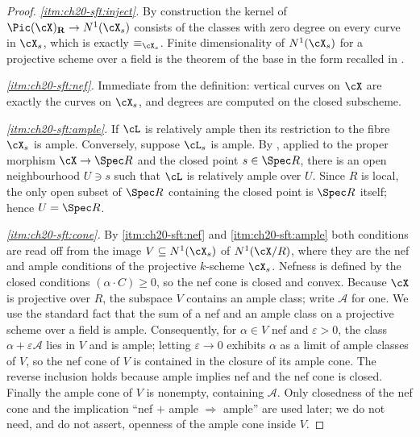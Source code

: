 \begin{proof}
\emph{\cref{itm:ch20-sft:inject}.}  By construction the kernel of
\(\Pic(\cX)_{\mathbf R}\to N^1(\cX_s)\) consists of the classes with zero
degree on every curve in \(\cX_s\), which is exactly \(\equiv_{\cX_s}\).
Finite dimensionality of \(N^1(\cX_s)\) for a projective scheme over a field
is the theorem of the base in the form recalled in
.

\emph{\cref{itm:ch20-sft:nef}.}  Immediate from the definition: vertical
curves on \(\cX\) are exactly the curves on \(\cX_s\), and degrees are
computed on the closed subscheme.

\emph{\cref{itm:ch20-sft:ample}.}  If \(\cL\) is relatively ample then its
restriction to the fibre \(\cX_s\) is ample.  Conversely, suppose
\(\cL_s\) is ample.  By \cite[4.7.1]{EGAIII1}, applied to the proper
morphism \(\cX\to\Spec R\) and the closed point \(s\in\Spec R\), there is an
open neighbourhood \(U\ni s\) such that \(\cL\) is relatively ample over
\(U\).  Since \(R\) is local, the only open subset of \(\Spec R\) containing
the closed point is \(\Spec R\) itself; hence \(U=\Spec R\).

\emph{\cref{itm:ch20-sft:cone}.}  By \cref{itm:ch20-sft:nef} and
\cref{itm:ch20-sft:ample} both conditions are read off from the image
\(V\subseteq N^1(\cX_s)\) of \(N^1(\cX/R)\), where they are the nef and
ample conditions of the projective \(k\)-scheme \(\cX_s\).  Nefness is
defined by the closed conditions \((\alpha\cdot C)\geq0\), so the nef cone
is closed and convex.  Because \(\cX\) is projective over \(R\), the
subspace \(V\) contains an ample class; write \(\mathcal A\) for one.  We
use the standard fact that the sum of a nef and an ample class on a
projective scheme over a field is ample.  Consequently, for \(\alpha\in V\)
nef and \(\varepsilon>0\), the class \(\alpha+\varepsilon\mathcal A\) lies in
\(V\) and is ample; letting \(\varepsilon\to0\) exhibits \(\alpha\) as a
limit of ample classes of \(V\), so the nef cone of \(V\) is contained in the
closure of its ample cone.  The reverse inclusion holds because ample
implies nef and the nef cone is closed.  Finally the ample cone of \(V\) is
nonempty, containing \(\mathcal A\).  Only closedness of the nef cone and
the implication ``nef \(+\) ample \(\Rightarrow\) ample'' are used later; we
do not need, and do not assert, openness of the ample cone inside \(V\).
\end{proof}

